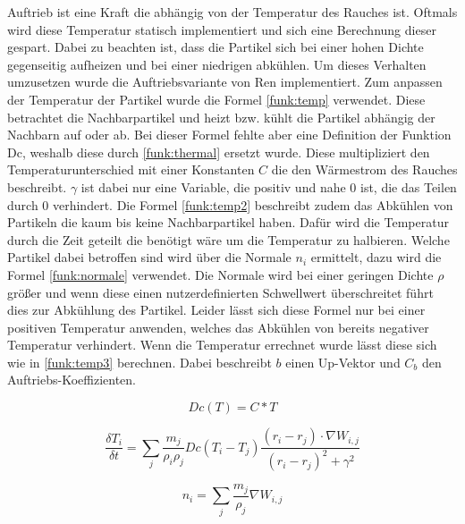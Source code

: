 \documentclass[intern,palatino]{cgBA}
\begin{document}
Auftrieb ist eine Kraft die abhängig von der Temperatur des Rauches ist. Oftmals wird diese Temperatur statisch implementiert und sich eine Berechnung dieser gespart. Dabei zu beachten ist, dass die Partikel sich bei einer hohen Dichte gegenseitig aufheizen und bei einer niedrigen abkühlen. Um dieses Verhalten umzusetzen wurde die Auftriebsvariante von Ren \cite{ren2016fast} implementiert.
\newline
Zum anpassen der Temperatur der Partikel wurde die Formel \ref{funk:temp} verwendet. Diese betrachtet die Nachbarpartikel und heizt bzw. kühlt die Partikel abhängig der Nachbarn auf oder ab. Bei dieser Formel fehlte aber eine Definition der Funktion Dc, weshalb diese durch \ref{funk:thermal} ersetzt wurde. Diese multipliziert den Temperaturunterschied mit einer Konstanten $C$ die den Wärmestrom des Rauches beschreibt. $\gamma$ ist dabei nur eine Variable, die positiv und nahe $0$ ist, die das Teilen durch $0$ verhindert.
\newline
Die Formel \ref{funk:temp2} beschreibt zudem das Abkühlen von Partikeln die kaum bis keine Nachbarpartikel haben. Dafür wird die Temperatur durch die Zeit geteilt die benötigt wäre um die Temperatur zu halbieren. Welche Partikel dabei betroffen sind wird über die Normale $n_i$ ermittelt, dazu wird die Formel \ref{funk:normale} verwendet. Die Normale wird bei einer geringen Dichte $\rho$ größer und wenn diese einen nutzerdefinierten Schwellwert überschreitet führt dies zur Abkühlung des Partikel. Leider lässt sich diese Formel nur bei einer positiven Temperatur anwenden, welches das Abkühlen von bereits negativer Temperatur verhindert.
\newline
Wenn die Temperatur errechnet wurde lässt diese sich wie in \ref{funk:temp3} berechnen. Dabei beschreibt $b$ einen Up-Vektor und $C_b$ den Auftriebs-Koeffizienten.

\begin{equation}\label{funk:thermal}
Dc(T)  = C * T
\end{equation}

\begin{equation}\label{funk:temp}
\frac{\delta T_i}{\delta t}  = \sum_j \frac{m_j}{\rho_i \rho_j} Dc(T_i - T_j) \frac{(r_i-r_j) \cdot \nabla W_{i,j}}{(r_i-r_j)^2 + \gamma^2}
\end{equation}

\begin{equation}\label{funk:normale}
n_i  = \sum_j \frac{m_j}{\rho_j} \nabla W_{i,j}
\end{equation}
\end{document}
